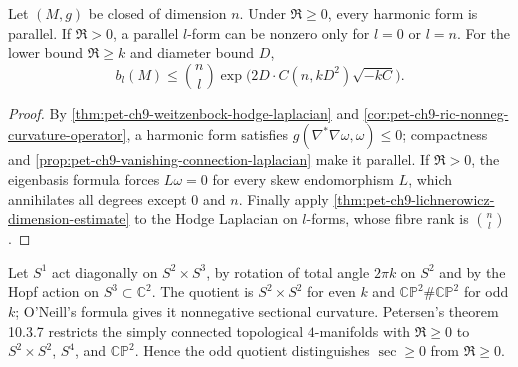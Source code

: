\begin{theorem}
  \label{thm:pet-ch9-nonneg-curvature-operator-parallel-forms}
  Let $(M,g)$ be closed of dimension $n$.  Under $\mathfrak R\ge0$, every
  harmonic form is parallel.  If $\mathfrak R>0$, a parallel $l$-form can be
  nonzero only for $l=0$ or $l=n$.  For the lower bound $\mathfrak R\ge k$ and
  diameter bound $D$,
  \[
    b_l(M)\le\binom{n}{l}
      \exp\big(2D\cdot C(n,kD^2)\sqrt{-kC}\big).
  \]
\end{theorem}
\begin{proof}
  \sketch
  By \cref{thm:pet-ch9-weitzenbock-hodge-laplacian} and
  \cref{cor:pet-ch9-ric-nonneg-curvature-operator}, a harmonic form satisfies
  \(g(\nabla^*\nabla\omega,\omega)\le0\); compactness and
  \cref{prop:pet-ch9-vanishing-connection-laplacian} make it parallel.  If
  \(\mathfrak R>0\), the eigenbasis formula forces
  \(L\omega=0\) for every skew endomorphism \(L\), which annihilates all
  degrees except \(0\) and \(n\).  Finally apply
  \cref{thm:pet-ch9-lichnerowicz-dimension-estimate} to the Hodge Laplacian on
  \(l\)-forms, whose fibre rank is \(\binom nl\).
\end{proof}

\begin{example}
  \label{ex:pet-ch9-cp2-connect-sum-nonneg-curvature}
  Let $S^1$ act diagonally on $S^2\times S^3$, by rotation of total angle
  $2\pi k$ on $S^2$ and by the Hopf action on
  $S^3\subset\mathbb C^2$.  The quotient is $S^2\times S^2$ for even $k$ and
  $\mathbb{CP}^2\#\mathbb{CP}^2$ for odd $k$; O'Neill's formula gives it
  nonnegative sectional curvature.  Petersen's theorem 10.3.7 restricts the
  simply connected topological $4$-manifolds with $\mathfrak R\ge0$ to
  $S^2\times S^2$, $S^4$, and $\mathbb{CP}^2$.  Hence the odd quotient
  distinguishes $\sec\ge0$ from $\mathfrak R\ge0$.
\end{example}

